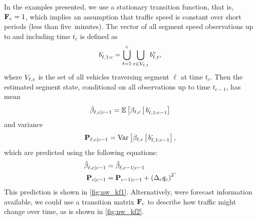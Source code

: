 In the examples presented, we use a stationary transition function, that is, $\mathbf{F}_c = 1$, which implies an assumption that traffic speed is constant over short periods (less than five~minutes). The vector of all segment speed observations up to and including time $t_{c}$ is defined as
\begin{equation}\label{eq:all_seg_obs}
b_{\ell,1:c}^{\boldsymbol{\cdot}} = \bigcup_{t=1}^{c} \bigcup_{v\in V_{\ell,t}} b_{\ell,t}^v,
\end{equation}
where $V_{\ell,c}$ is the set of all vehicles traversing segment $\ell$ at time $t_c$. Then the estimated segment state, conditional on all observations up to time $t_{c-1}$, has mean
\begin{equation}\label{eq:ch4:nw_state_mean_est}
\hat{\beta}_{\ell,c|c-1} =
    \mathbb{E}\left[\beta_{\ell,c} \,\big|\,{} b_{\ell,1:c-1}^{\boldsymbol{\cdot}}\right]
\end{equation}
and variance
\begin{equation}\label{eq:ch4:nw_state_var_est}
\mathbf{P}_{\ell,c|c-1} =
    \mathrm{Var}\left[\beta_{\ell,c} \,\big|\,{} b_{\ell,1:c-1}^{\boldsymbol{\cdot}}\right],
\end{equation}
which are predicted using the following equations:
\begin{equation}
\label{eq:nw_kf_predict}
\begin{split}
\hat{\beta}_{\ell,c|c-1} &=
    \hat{\beta}_{
\ell,c-1|c-1} \\
\mathbf{P}_{c|c-1} &= \mathbf{P}_{c-1|c-1} + \left(\Delta_cq_c\right)^2
\end{split}.
\end{equation}
This prediction is shown in \cref{fig:nw_kf1}. Alternatively, were forecast information available, we could use a transition matrix $\mathbf{F}_c$ to describe how traffic might change over time, as is shown in \cref{fig:nw_kf2}.


